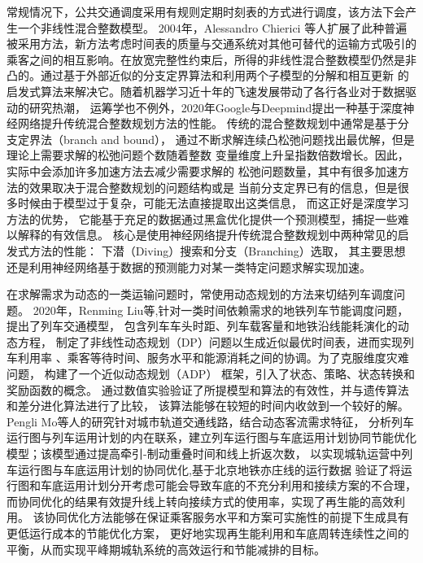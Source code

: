 常规情况下，公共交通调度采用有规则定期时刻表的方式进行调度，该方法下会产生一个非线性混合整数模型。
2004年，Alessandro Chierici
等人扩展了此种普遍被采用方法\cite{CHIERICI200499}，新方法考虑时间表的质量与交通系统对其他可替代的运输方式吸引的
乘客之间的相互影响。在放宽完整性约束后，所得的非线性混合整数模型仍然是非
凸的。通过基于外部近似的分支定界算法和利用两个子模型的分解和相互更新
的启发式算法来解决它。随着机器学习近十年的飞速发展带动了各行各业对于数据驱动的研究热潮，
运筹学也不例外，2020年Google与Deepmind提出一种基于深度神经网络提升传统混合整数规划方法的性能\cite{nair2021solving}。
传统的混合整数规划中通常是基于分支定界法（branch and bound），
通过不断求解连续凸松弛问题找出最优解，但是理论上需要求解的松弛问题个数随着整数
变量维度上升呈指数倍数增长。因此，实际中会添加许多加速方法去减少需要求解的
松弛问题数量，其中有很多加速方法的效果取决于混合整数规划的问题结构或是
当前分支定界已有的信息，但是很多时候由于模型过于复杂，可能无法直接提取出这类信息，
而这正好是深度学习方法的优势，
它能基于充足的数据通过黑盒优化提供一个预测模型，捕捉一些难以解释的有效信息。
核心是使用神经网络提升传统混合整数规划中两种常见的启发式方法的性能：
下潜（Diving）搜索和分支（Branching）选取，
其主要思想还是利用神经网络基于数据的预测能力对某一类特定问题求解实现加速。


在求解需求为动态的一类运输问题时，常使用动态规划的方法来切结列车调度问题。
2020年，Renming Liu等,针对一类时间依赖需求的地铁列车节能调度问题，提出了列车交通模型\cite{8337127}，
包含列车车头时距、列车载客量和地铁沿线能耗演化的动态方程，
制定了非线性动态规划（DP）问题以生成近似最优时间表，进而实现列车利用率
、乘客等待时间、服务水平和能源消耗之间的协调。为了克服维度灾难问题，
构建了一个近似动态规划（ADP） 框架，引入了状态、策略、状态转换和奖励函数的概念。
通过数值实验验证了所提模型和算法的有效性，并与遗传算法和差分进化算法进行了比较，
该算法能够在较短的时间内收敛到一个较好的解。Pengli Mo等人的研究\cite{8782134}针对城市轨道交通线路，结合动态客流需求特征，
分析列车运行图与列车运用计划的内在联系，建立列车运行图与车底运用计划协同节能优化模型；该模型通过提高牵引-制动重叠时间和线上折返次数，
以实现城轨运营中列车运行图与车底运用计划的协同优化,基于北京地铁亦庄线的运行数据
验证了将运行图和车底运用计划分开考虑可能会导致车底的不充分利用和接续方案的不合理，而协同优化的结果有效提升线上转向接续方式的使用率，实现了再生能的高效利用。
该协同优化方法能够在保证乘客服务水平和方案可实施性的前提下生成具有更低运行成本的节能优化方案，
更好地实现再生能利用和车底周转连续性之间的平衡，从而实现平峰期城轨系统的高效运行和节能减排的目标。

